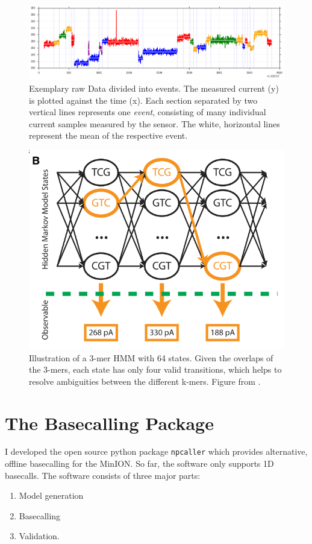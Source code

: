 \documentclass[]{scrartcl}
\begin{document}
\begin{figure}[htbp]
\centering
\includegraphics[width=\linewidth]{figures/squiggle.png}
\caption{Exemplary raw Data divided into events. The measured current (y) is plotted against the time (x). Each section separated by two vertical lines represents one \textit{event}, consisting of many individual current samples measured by the sensor. The white, horizontal lines represent the mean of the respective event. }
\label{fig:squiggle}
\end{figure}

\begin{figure}[htbp]
\centering
\includegraphics[width=.5\linewidth]{figures/hmm.png}
\caption{Illustration of a 3-mer HMM with 64 states. Given the overlaps of the 3-mers, each state has only four valid transitions, which helps to resolve ambiguities between the different k-mers. Figure from \textcite{Timp2012a}.}
\label{fig:hmm}
\end{figure}



\section{The Basecalling Package}
I developed the open source python package \texttt{npcaller} which provides alternative, offline basecalling for the MinION. So far, the software only supports 1D basecalls. The software consists of three major parts:

\begin{enumerate}
\item Model generation
\item Basecalling
\item Validation.
\end{enumerate}
\end{document}
